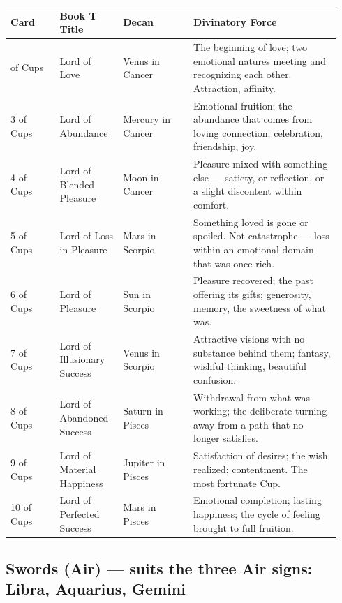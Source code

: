 \begin{longtable}[]{@{}>{\RaggedRight\small}p{0.14\linewidth}>{\RaggedRight\small}p{0.18\linewidth}>{\RaggedRight\small}p{0.20\linewidth}>{\RaggedRight\small}p{0.42\linewidth}@{}}
\toprule\noalign{}
Card & Book T Title & Decan & Divinatory Force \\
\midrule\noalign{}
\endhead
\bottomrule\noalign{}
\endlastfoot
2 of Cups & Lord of Love & Venus in Cancer & The beginning of love; two emotional natures meeting and recognizing each other. Attraction, affinity. \\
3 of Cups & Lord of Abundance & Mercury in Cancer & Emotional fruition; the abundance that comes from loving connection; celebration, friendship, joy. \\
4 of Cups & Lord of Blended Pleasure & Moon in Cancer & Pleasure mixed with something else --- satiety, or reflection, or a slight discontent within comfort. \\
5 of Cups & Lord of Loss in Pleasure & Mars in Scorpio & Something loved is gone or spoiled. Not catastrophe --- loss within an emotional domain that was once rich. \\
6 of Cups & Lord of Pleasure & Sun in Scorpio & Pleasure recovered; the past offering its gifts; generosity, memory, the sweetness of what was. \\
7 of Cups & Lord of Illusionary Success & Venus in Scorpio & Attractive visions with no substance behind them; fantasy, wishful thinking, beautiful confusion. \\
8 of Cups & Lord of Abandoned Success & Saturn in Pisces & Withdrawal from what was working; the deliberate turning away from a path that no longer satisfies. \\
9 of Cups & Lord of Material Happiness & Jupiter in Pisces & Satisfaction of desires; the wish realized; contentment. The most fortunate Cup. \\
10 of Cups & Lord of Perfected Success & Mars in Pisces & Emotional completion; lasting happiness; the cycle of feeling brought to full fruition. \\
\end{longtable}

\subsection{Swords (Air) --- suits the three Air signs: Libra, Aquarius, Gemini}\label{swords-air--suits-the-three-air-signs-libra-aquarius-gemini}


